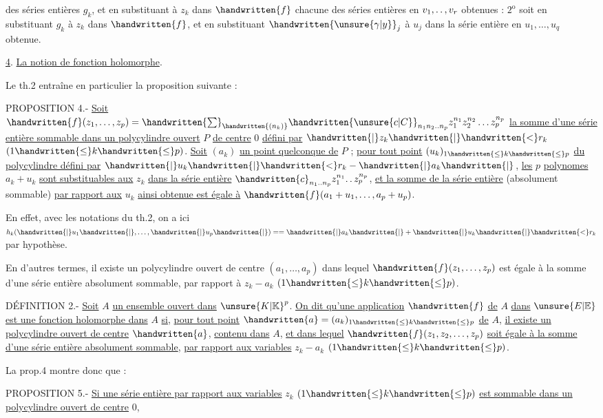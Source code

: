  des séries entières $g_k$, et en substituant à $z_k$ dans $\handwritten{f}$ chacune des séries entières en $v_1,\ldotp\ldotp,v_r$ obtenues : $2^{\mathrm{o}}$ soit en substituant $g_k$ à $z_k$ dans $\handwritten{f}$, et en substituant $\handwritten{\unsure{\gamma|y}}_j$ à $u_j$ dans la série entière en $u_1,\ldots,u_q$ obtenue.

\uline{4}. \uline{La notion de fonction holomorphe}.

Le th.2 entraîne en particulier la proposition suivante :

PROPOSITION 4.- \uline{Soit} $\handwritten{f}(z_1,\ldots,z_p)=\handwritten{\sum}_{\handwritten{(n_k)}}\handwritten{\unsure{c|C}}_{n_1n_2\ldotp\ldotp n_p}z_1^{n_1}z_2^{n_2}\ldots z_p^{n_p}$ \uline{la somme d'une série entière sommable dans un polycylindre ouvert} $P$ \uline{de centre} $0$ \uline{défini par} $\handwritten{|}z_k\handwritten{|}\handwritten{<}r_k$ $(1\handwritten{\leq}k\handwritten{\leq}p)$. \uline{Soit} $(a_k)$ \uline{un point quelconque de} $P$ ; \uline{pour tout point} $(u_k)_{1\handwritten{\leq}k\handwritten{\leq}p}$ \uline{du polycylindre défini par} $\handwritten{|}u_k\handwritten{|}\handwritten{<}r_k-\handwritten{|}a_k\handwritten{|}$, \uline{les} $p$ \uline{polynomes} $a_k+u_k$ \uline{sont substituables aux} $z_k$ \uline{dans la série entière} $\handwritten{c}_{n_1\ldotp\ldotp n_p}z_1^{n_1}\ldotp\ldotp z_p^{n_p}$, \uline{et la somme de la série entière} (absolument sommable) \uline{par rapport aux} $u_k$ \uline{ainsi obtenue est égale à} $\handwritten{f}(a_1+u_1,\ldots,a_p+u_p)$.

En effet, avec les notations du th.2, on a ici $h_k(\handwritten{|}u_1\handwritten{|},\ldots,\handwritten{|}u_p\handwritten{|})==\handwritten{|}a_k\handwritten{|}+\handwritten{|}u_k\handwritten{|}\handwritten{<}r_k$ par hypothèse.

En d'autres termes, il existe un polycylindre ouvert de centre $(a_1,\ldots,a_p)$ dans lequel $\handwritten{f}(z_1,\ldots,z_p)$ est égale à la somme d'une série entière absolument sommable, par rapport à $z_k-a_k$ $(1\handwritten{\leq}k\handwritten{\leq}p)$.

DÉFINITION 2.- \uline{Soit} $A$ \uline{un ensemble ouvert dans} ${\unsure{K|\mathbb{K}}}^{p}$. \uline{On dit qu'une application} $\handwritten{f}$ \uline{de} $A$ \uline{dans} $\unsure{E|\mathbb{E}}$ \uline{est une fonction holomorphe dans} $A$ \uline{si}, \uline{pour tout point} $\handwritten{a}=(a_k)_{1\handwritten{\leq}k\handwritten{\leq}p}$ \uline{de} $A$, \uline{il existe un polycylindre ouvert de centre} $\handwritten{a}$, \uline{contenu dans} $A$, \uline{et dans lequel} $\handwritten{f}(z_1,z_2,\ldots,z_p)$ \uline{soit égale à la somme d'une série entière absolument sommable}, \uline{par rapport aux variables} $z_k-a_k$ $(1\handwritten{\leq}k\handwritten{\leq}p)$.

La prop.4 montre donc que :

PROPOSITION 5.- \uline{Si une série entière par rapport aux variables} $z_k$ $(1\handwritten{\leq}k\handwritten{\leq}p)$ \uline{est sommable dans un polycylindre ouvert de centre} $0$,
